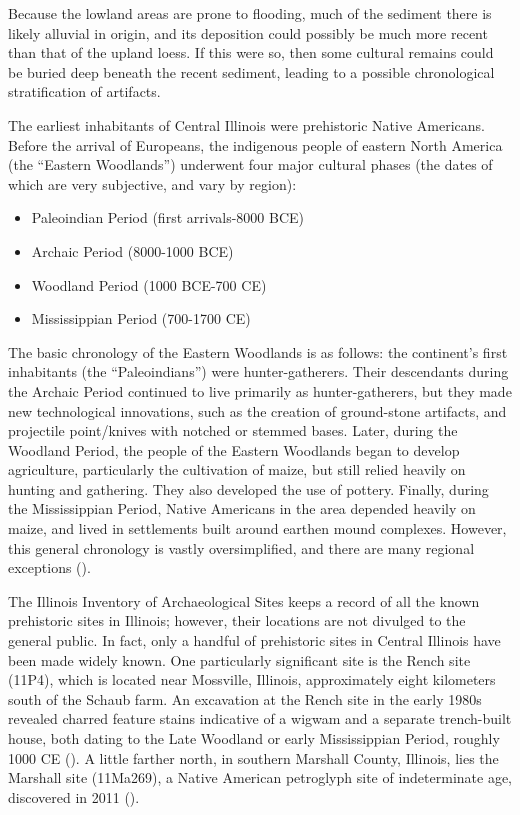 Because the lowland areas are prone to flooding, much of the sediment there is likely alluvial in origin, and its deposition could possibly be much more recent than that of the upland loess. If this were so, then some cultural remains could be buried deep beneath the recent sediment, leading to a possible chronological stratification of artifacts.


The earliest inhabitants of Central Illinois were prehistoric Native Americans. Before the arrival of Europeans, the indigenous people of eastern North America (the “Eastern Woodlands”) underwent four major cultural phases (the dates of which are very subjective, and vary by region):

\begin{itemize}
	\item Paleoindian Period (first arrivals-8000 BCE)
	\item Archaic Period (8000-1000 BCE)
	\item Woodland Period (1000 BCE-700 CE)
	\item Mississippian Period (700-1700 CE)
\end{itemize}

The basic chronology of the Eastern Woodlands is as follows: the continent’s first inhabitants (the “Paleoindians”) were hunter-gatherers. Their descendants during the Archaic Period continued to live primarily as hunter-gatherers, but they made new technological innovations, such as the creation of ground-stone artifacts, and projectile point/knives with notched or stemmed bases. Later, during the Woodland Period, the people of the Eastern Woodlands began to develop agriculture, particularly the cultivation of maize, but still relied heavily on hunting and gathering. They also developed the use of pottery. Finally, during the Mississippian Period, Native Americans in the area depended heavily on maize, and lived in settlements built around earthen mound complexes. However, this general chronology is vastly oversimplified, and there are many regional exceptions (\cite{gibbon1998}).

The Illinois Inventory of Archaeological Sites keeps a record of all the known prehistoric sites in Illinois; however, their locations are not divulged to the general public. In fact, only a handful of prehistoric sites in Central Illinois have been made widely known. One particularly significant site is the Rench site (11P4), which is located near Mossville, Illinois, approximately eight kilometers south of the Schaub farm. An excavation at the Rench site in the early 1980s revealed charred feature stains indicative of a wigwam and a separate trench-built house, both dating to the Late Woodland or early Mississippian Period, roughly 1000 CE (\cite{mcconaughy1985}). A little farther north, in southern Marshall County, Illinois, lies the Marshall site (11Ma269), a Native American petroglyph site of indeterminate age, discovered in 2011 (\cite{wagner2013}).

